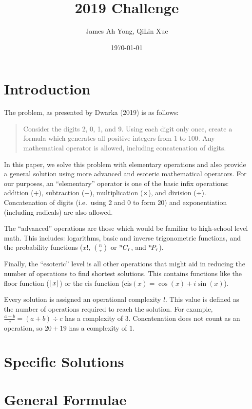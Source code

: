 \documentclass{article}
\title{2019 Challenge}
\author{James Ah Yong, QiLin Xue}
\date\today
\DeclarePairedDelimiter\floor{\lfloor}{\rfloor}
\newcommand*{\permcomb}[4][0mu]{{{}^{#3}\mkern#1#2_{#4}}}
\newcommand*{\perm}[1][-3mu]{\permcomb[#1]{P}}
\newcommand*{\comb}[1][-1mu]{\permcomb[#1]{C}}
\begin{document}
\maketitle

\section{Introduction}

The problem, as presented by Dwarka (2019) is as follows:

\begin{quotation}
  Consider the digits 2, 0, 1, and 9.
  Using each digit only once, create a formula which generates all positive integers from 1 to 100.
  Any mathematical operator is allowed, including concatenation of digits.
\end{quotation}

In this paper, we solve this problem with elementary operations and also provide a general solution using more advanced and esoteric mathematical operators.
For our purposes, an ``elementary'' operator is one of the basic infix operations: addition ($+$), subtraction ($-$), multiplication ($\times$), and division ($\div$).
Concatenation of digits (i.e.\ using 2 and 0 to form 20) and exponentiation (including radicals) are also allowed.

The ``advanced'' operations are those which would be familiar to high-school level math.
This includes: logarithms, basic and inverse trigonometric functions, and the probability functions ($x!$, $\binom{n}{r}$ or $\comb{n}{r}$, and $\perm{n}{r}$).

Finally, the ``esoteric'' level is all other operations that might aid in reducing the number of operations to find shortest solutions.
This contains functions like the floor function ($\floor{x}$) or the cis function ($\mathrm{cis}(x) = \cos(x) + i \sin(x)$).

Every solution is assigned an operational complexity $l$.
This value is defined as the number of operations required to reach the solution.
For example, $\frac{a+b}{c}=(a+b)\div c$ has a complexity of 3.
Concatenation does not count as an operation, so $20+19$ has a complexity of 1.

\section{Specific Solutions}



\section{General Formulae}


\end{document}

